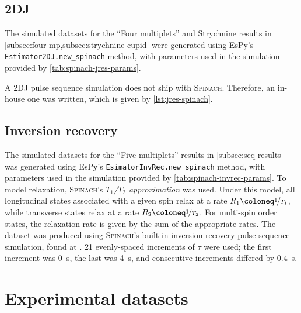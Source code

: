 

\subsection{\acs{2DJ}}
The simulated datasets for the ``Four multiplets'' and Strychnine results in
\cref{subsec:four-mp,subsec:strychnine-cupid} were generated
using \ac{EsPy}'s \texttt{Estimator2DJ.new_spinach} method, with
parameters used in the simulation provided by
\cref{tab:spinach-jres-params}.



A \ac{2DJ} pulse sequence simulation does not ship with \textsc{Spinach}.
Therefore, an in-house one was written, which is given by
\cref{lst:jres-spinach}.


\subsection{Inversion recovery}
\label{subsec:invrec-datasets}
The simulated datasets for the ``Five multiplets'' results in
\cref{subsec:seq-results} was generated using \ac{EsPy}'s
\texttt{EsimatorInvRec.new_spinach} method, with
parameters used in the simulation provided by
\cref{tab:spinach-invrec-params}.
To model relaxation, \textsc{Spinach}'s \emph{$T_1$/$T_2$ approximation} was
used\cite{SpinachRelax}. Under this model, all longitudinal states associated
with a given spin relax at a rate $R_1 \coloneq \nicefrac{1}{T_1}$, while
transverse states relax at a rate $R_2 \coloneq \nicefrac{1}{T_2}$. For
multi-spin order states, the relaxation rate is given by the sum of the
appropriate rates. The dataset was produced using \textsc{Spinach}'s built-in
inversion recovery pulse sequence simulation, found at
. 21 evenly-spaced increments of
$\tau$ were used; the first increment was \qty{0}{\second}, the last was
\qty{4}{\second}, and consecutive increments differed by \qty{0.4}{\second}.



\section{Experimental datasets}

